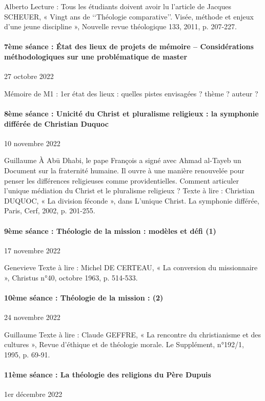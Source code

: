 Alberto
Lecture : Tous les étudiants doivent avoir lu l’article de Jacques SCHEUER, « Vingt ans de ‘‘Théologie comparative’’. Visée, méthode et enjeux d’une jeune discipline », Nouvelle revue théologique 133, 2011, p. 207-227.

\paragraph{7ème séance : État des lieux de projets de mémoire – Considérations méthodologiques sur une problématique de master}    27 octobre 2022 


Mémoire de M1 : 1er état des lieux : quelles pistes envisagées ? thème ? auteur ?  
 
\paragraph{8ème séance : Unicité du Christ et pluralisme religieux : la symphonie différée de Christian Duquoc}    10 novembre 2022

Guillaume
 À Abū Dhabi, le pape François a signé avec Ahmad al-Tayeb un Document sur la fraternité humaine. Il ouvre à une manière renouvelée pour penser les différences religieuses comme providentielles. Comment articuler l’unique médiation du Christ et le pluralisme religieux ? 
Texte à lire : Christian DUQUOC, « La division féconde », dans L’unique Christ. La symphonie différée, Paris, Cerf, 2002, p. 201-255. 
\paragraph{9ème séance : Théologie de la mission : modèles et défi (1)}    17 novembre 2022

Genevieve
Texte à lire : Michel DE CERTEAU, « La conversion du missionnaire », Christus n°40, octobre 1963, p. 514-533.

\paragraph{10ème séance : Théologie de la mission :  (2)}    24 novembre 2022

Guillaume
Texte à lire : Claude GEFFRE, « La rencontre du christianisme et des cultures », Revue d’éthique et de théologie morale. Le Supplément, n°192/1, 1995, p. 69-91. 


\paragraph{11ème séance : La théologie des religions du Père Dupuis}   1er décembre 2022

